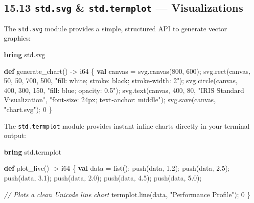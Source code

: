 \documentclass[
  english,
]{book}
\newenvironment{Shaded}{\begin{snugshade}}{\end{snugshade}}
\newcommand{\CommentTok}[1]{\textcolor[rgb]{0.42,0.60,0.33}{\textit{#1}}}
\newcommand{\DataTypeTok}[1]{\textcolor[rgb]{0.31,0.79,0.69}{#1}}
\newcommand{\DecValTok}[1]{\textcolor[rgb]{0.71,0.81,0.66}{#1}}
\newcommand{\FloatTok}[1]{\textcolor[rgb]{0.71,0.81,0.66}{#1}}
\newcommand{\FunctionTok}[1]{\textcolor[rgb]{0.86,0.86,0.67}{#1}}
\newcommand{\KeywordTok}[1]{\textcolor[rgb]{0.34,0.61,0.84}{\textbf{#1}}}
\newcommand{\NormalTok}[1]{\textcolor[rgb]{0.83,0.83,0.83}{#1}}
\newcommand{\OperatorTok}[1]{\textcolor[rgb]{0.83,0.83,0.83}{#1}}
\newcommand{\StringTok}[1]{\textcolor[rgb]{0.81,0.57,0.47}{#1}}
\begin{document}
\subsection{\texorpdfstring{15.13 \texttt{std.svg} \&
\texttt{std.termplot} ---
Visualizations}{15.13 std.svg \& std.termplot --- Visualizations}}\label{std.svg-std.termplot-visualizations}

The \texttt{std.svg} module provides a simple, structured API to
generate vector graphics:

\begin{Shaded}
\begin{Highlighting}[]
\KeywordTok{bring}\NormalTok{ std}\OperatorTok{.}\NormalTok{svg}

\KeywordTok{def}\NormalTok{ generate\_chart() }\OperatorTok{{-}\textgreater{}} \DataTypeTok{i64}\NormalTok{ \{}
    \KeywordTok{val}\NormalTok{ canvas }\OperatorTok{=}\NormalTok{ svg}\OperatorTok{.}\NormalTok{canvas(}\DecValTok{800}\NormalTok{, }\DecValTok{600}\NormalTok{);}
\NormalTok{    svg}\OperatorTok{.}\NormalTok{rect(canvas, }\DecValTok{50}\NormalTok{, }\DecValTok{50}\NormalTok{, }\DecValTok{700}\NormalTok{, }\DecValTok{500}\NormalTok{, }\StringTok{"fill: white; stroke: black; stroke{-}width: 2"}\NormalTok{);}
\NormalTok{    svg}\OperatorTok{.}\NormalTok{circle(canvas, }\DecValTok{400}\NormalTok{, }\DecValTok{300}\NormalTok{, }\DecValTok{150}\NormalTok{, }\StringTok{"fill: blue; opacity: 0.5"}\NormalTok{);}
\NormalTok{    svg}\OperatorTok{.}\NormalTok{text(canvas, }\DecValTok{400}\NormalTok{, }\DecValTok{80}\NormalTok{, }\StringTok{"IRIS Standard Visualization"}\NormalTok{, }\StringTok{"font{-}size: 24px; text{-}anchor: middle"}\NormalTok{);}
\NormalTok{    svg}\OperatorTok{.}\NormalTok{save(canvas, }\StringTok{"chart.svg"}\NormalTok{);}
    \DecValTok{0}
\NormalTok{\}}
\end{Highlighting}
\end{Shaded}

The \texttt{std.termplot} module provides instant inline charts directly
in your terminal output:

\begin{Shaded}
\begin{Highlighting}[]
\KeywordTok{bring}\NormalTok{ std}\OperatorTok{.}\NormalTok{termplot}

\KeywordTok{def}\NormalTok{ plot\_live() }\OperatorTok{{-}\textgreater{}} \DataTypeTok{i64}\NormalTok{ \{}
    \KeywordTok{val}\NormalTok{ data }\OperatorTok{=} \DataTypeTok{list}\NormalTok{();}
    \FunctionTok{push}\NormalTok{(data, }\FloatTok{1.2}\NormalTok{); }\FunctionTok{push}\NormalTok{(data, }\FloatTok{2.5}\NormalTok{); }\FunctionTok{push}\NormalTok{(data, }\FloatTok{3.1}\NormalTok{);}
    \FunctionTok{push}\NormalTok{(data, }\FloatTok{2.0}\NormalTok{); }\FunctionTok{push}\NormalTok{(data, }\FloatTok{4.5}\NormalTok{); }\FunctionTok{push}\NormalTok{(data, }\FloatTok{5.0}\NormalTok{);}
    
    \CommentTok{// Plots a clean Unicode line chart}
\NormalTok{    termplot}\OperatorTok{.}\NormalTok{line(data, }\StringTok{"Performance Profile"}\NormalTok{);}
    \DecValTok{0}
\NormalTok{\}}
\end{Highlighting}
\end{Shaded}
\end{document}

